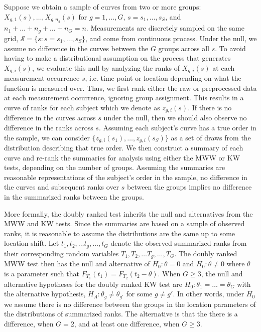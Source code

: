 \documentclass[12pt]{article}
\theoremstyle{plain}
\begin{document}
	Suppose we obtain a sample of curves from two or more groups: $X_{g,1}(s), \ldots, X_{g, n_g}(s)$ for $g = 1, \ldots, G$, $s = s_1, \ldots, s_S$, and $n_1 + \ldots + n_g + \ldots + n_G = n$. Measurements are discretely sampled on the same grid, $\mathcal{S} = \{s : s = s_1, \ldots, s_S\}$, and come from continuous process. Under the null, we assume no difference in the curves between the $G$ groups across all $s$. To avoid having to make a distributional assumption on the process that generates $X_{g,i}(s)$, we evaluate this null by analyzing the ranks of $X_{g,i}(s)$ at each measurement occurrence $s$, i.e. time point or location depending on what the function is measured over. Thus, we first rank either the raw or preprocessed data at each measurement occurrence, ignoring group assignment. This results in a curve of ranks for each subject which we denote as $z_{g,i}(s)$. If there is no difference in the curves across $s$ under the null, then we should also observe no difference in the ranks across $s$. Assuming each subject's curve has a true order in the sample, we can consider $\{z_{g,i}(s_1), \ldots, z_{g,i}(s_S)\}$ as a set of draws from the distribution describing that true order. We then construct a summary of each curve and re-rank the summaries for analysis using either the MWW or KW tests, depending on the number of groups. Assuming the summaries are reasonable representations of the subject's order in the sample, no difference in the curves and subsequent ranks over $s$ between the groups implies no difference in the summarized ranks between the groups.
	
	More formally, the doubly ranked test inherits the null and alternatives from the MWW and KW tests. Since the summaries are based on a sample of observed ranks, it is reasonable to assume the distributions are the same up to some location shift. Let $t_1, t_2, \ldots t_g, \ldots, t_G$ denote the observed summarized ranks from their corresponding random variables $T_1, T_2, \ldots T_g, \ldots, T_G$. The doubly ranked MWW test then has the null and alternative of $H_0: \theta = 0$ and $H_0: \theta \neq 0$ where $\theta$ is a parameter such that $F_{T_1}(t_1) = F_{T_2}(t_2-\theta)$. When $G \geq 3$, the null and alternative hypotheses for the doubly ranked KW test are $H_0 : \theta_1 = \ldots = \theta_G$ with the alternative hypothesis, $H_A : \theta_g \neq \theta_{g'}$ for some $g \neq g'$. In other words, under $H_0$ we assume there is no difference between the groups in the location parameters of the distributions of summarized ranks. The alternative is that the there is a difference, when $G = 2$, and at least one difference, when $G \geq 3$. 
	
\end{document}
